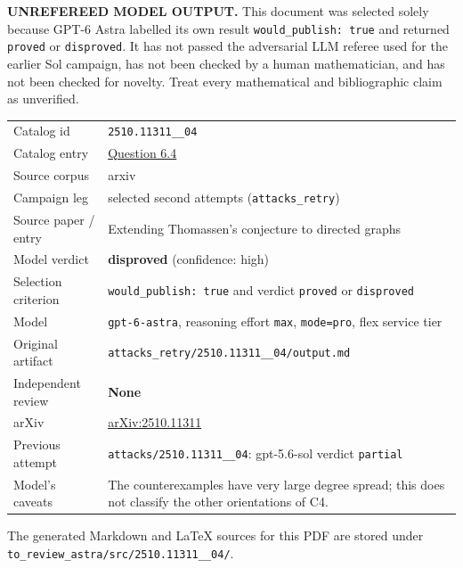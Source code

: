 \documentclass[
  11pt,
  a4paper,
]{article}
\newcounter{none} %
\begin{document}
\begin{warning}

\textbf{UNREFEREED MODEL OUTPUT.} This document was selected solely
because GPT-6 Astra labelled its own result
\texttt{would\_publish:\ true} and returned \texttt{proved} or
\texttt{disproved}. It has not passed the adversarial LLM referee used
for the earlier Sol campaign, has not been checked by a human
mathematician, and has not been checked for novelty. Treat every
mathematical and bibliographic claim as unverified.

\end{warning}

{\def\LTcaptype{none} %
\begin{longtable}[]{@{}
  >{\raggedright\arraybackslash}p{}
  >{\raggedright\arraybackslash}p{}@{}}
\toprule\noalign{}
\endhead
\bottomrule\noalign{}
\endlastfoot
Catalog id & \texttt{2510.11311\_\_04} \\
Catalog entry &
\href{https://graph-theory-ai.github.io/graph-conjectures/arxiv/2510.11311__04/}{Question
6.4} \\
Source corpus & arxiv \\
Campaign leg & selected second attempts (\texttt{attacks\_retry}) \\
Source paper / entry & Extending Thomassen's conjecture to directed
graphs \\
Model verdict & \textbf{disproved} (confidence: high) \\
Selection criterion & \texttt{would\_publish:\ true} and verdict
\texttt{proved} or \texttt{disproved} \\
Model & \texttt{gpt-6-astra}, reasoning effort \texttt{max},
\texttt{mode=pro}, flex service tier \\
Original artifact &
\texttt{attacks\_retry/2510.11311\_\_04/output.md} \\
Independent review & \textbf{None} \\
arXiv & \href{https://arxiv.org/abs/2510.11311}{arXiv:2510.11311} \\
Previous attempt & \texttt{attacks/2510.11311\_\_04}: gpt-5.6-sol
verdict \texttt{partial} \\
Model's caveats & The counterexamples have very large degree spread;
this does not classify the other orientations of C4. \\
\end{longtable}
}

The generated Markdown and LaTeX sources for this PDF are stored under
\texttt{to\_review\_astra/src/2510.11311\_\_04/}.
\end{document}
